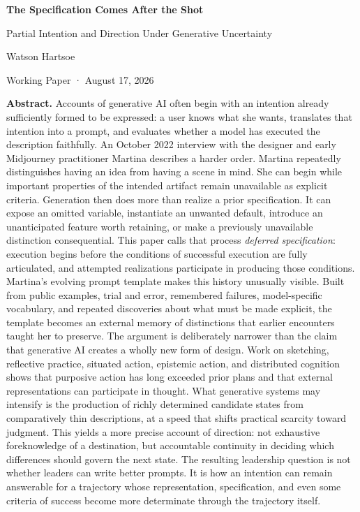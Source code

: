 \documentclass[
  11pt,
  letterpaper,
]{article}
\author{}
\date{}
\begin{document}
\thispagestyle{empty}

\begin{center}
{\LARGE\bfseries The Specification Comes After the Shot\par}
\vspace{0.4em}
{\large Partial Intention and Direction Under Generative Uncertainty\par}
\vspace{1.2em}
{\normalsize Watson Hartsoe\par}
\vspace{0.25em}
{\small Working Paper · August 17, 2026\par}
\end{center}

\vspace{1.2em}

\noindent\textbf{Abstract.} Accounts of generative AI often begin with
an intention already sufficiently formed to be expressed: a user knows
what she wants, translates that intention into a prompt, and evaluates
whether a model has executed the description faithfully. An October 2022
interview with the designer and early Midjourney practitioner Martina
describes a harder order. Martina repeatedly distinguishes having an
idea from having a scene in mind. She can begin while important
properties of the intended artifact remain unavailable as explicit
criteria. Generation then does more than realize a prior specification.
It can expose an omitted variable, instantiate an unwanted default,
introduce an unanticipated feature worth retaining, or make a previously
unavailable distinction consequential. This paper calls that process
\emph{deferred specification}: execution begins before the conditions of
successful execution are fully articulated, and attempted realizations
participate in producing those conditions. Martina's evolving prompt
template makes this history unusually visible. Built from public
examples, trial and error, remembered failures, model-specific
vocabulary, and repeated discoveries about what must be made explicit,
the template becomes an external memory of distinctions that earlier
encounters taught her to preserve. The argument is deliberately narrower
than the claim that generative AI creates a wholly new form of design.
Work on sketching, reflective practice, situated action, epistemic
action, and distributed cognition shows that purposive action has long
exceeded prior plans and that external representations can participate
in thought. What generative systems may intensify is the production of
richly determined candidate states from comparatively thin descriptions,
at a speed that shifts practical scarcity toward judgment. This yields a
more precise account of direction: not exhaustive foreknowledge of a
destination, but accountable continuity in deciding which differences
should govern the next state. The resulting leadership question is not
whether leaders can write better prompts. It is how an intention can
remain answerable for a trajectory whose representation, specification,
and even some criteria of success become more determinate through the
trajectory itself.
\end{document}
